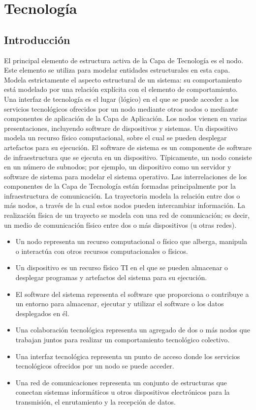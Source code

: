 \chapter{Tecnología}
\section{Introducción}
El principal elemento de estructura activa de la Capa de Tecnología es el nodo. Este elemento se utiliza para modelar entidades estructurales en esta capa. Modela estrictamente el aspecto estructural de un sistema: su comportamiento está modelado por una relación explícita con el elemento de comportamiento. Una interfaz de tecnología es el lugar (lógico) en el que se puede acceder a los servicios tecnológicos ofrecidos por un nodo mediante otros nodos o mediante componentes de aplicación de la Capa de Aplicación. Los nodos vienen en varias presentaciones, incluyendo software de dispositivos y sistemas. Un dispositivo modela un recurso físico computacional, sobre el cual se pueden desplegar artefactos para su ejecución. El software de sistema es un componente de software de infraestructura que se ejecuta en un dispositivo. Típicamente, un nodo consiste en un número de subnodos; por ejemplo, un dispositivo como un servidor y software de sistema para modelar el sistema operativo.
Las interrelaciones de los componentes de la Capa de Tecnología están formadas principalmente por la infraestructura de comunicación. La trayectoria modela la relación entre dos o más nodos, a través de la cual estos nodos pueden intercambiar información. La realización física de un trayecto se modela con una red de comunicación; es decir, un medio de comunicación físico entre dos o más dispositivos (u otras redes).

\begin{itemize}
	\item Un nodo representa un recurso computacional o físico que alberga, manipula o interactúa con otros recursos computacionales o físicos.
	\item Un dispositivo es un recurso físico TI en el que se pueden almacenar o desplegar programas y artefactos del sistema para su ejecución.
	\item El software del sistema representa el software que proporciona o contribuye a un entorno para almacenar, ejecutar y utilizar el software o los datos desplegados en él.
	\item Una colaboración tecnológica representa un agregado de dos o más nodos que trabajan juntos para realizar un comportamiento tecnológico colectivo.
	\item Una interfaz tecnológica representa un punto de acceso donde los servicios tecnológicos ofrecidos por un nodo
	se puede acceder.
	\item Una red de comunicaciones representa un conjunto de estructuras que conectan sistemas informáticos u otros dispositivos electrónicos para la transmisión, el enrutamiento y la recepción de datos.
\end{itemize}

